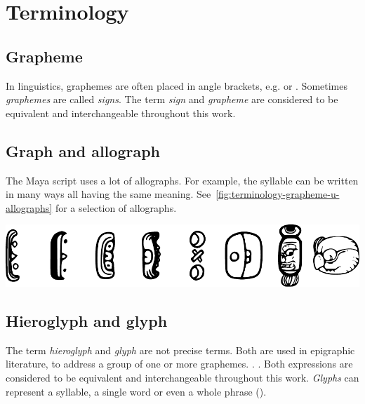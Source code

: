 \documentclass[../main.tex]{subfiles}
\begin{document}
\chapter{Terminology}

\section{Grapheme}
In linguistics, graphemes are often placed in angle brackets, e.g.  or .
Sometimes \emph{graphemes} are called \emph{signs}.
The term \emph{sign} and \emph{grapheme} are considered to be equivalent and 
interchangeable throughout this work.

\section{Graph and allograph}
The Maya script uses a lot of allographs.
For example, the syllable  can be written in many ways all having the same meaning.
See~\ref{fig:terminology-grapheme-u-allographs} for a selection of allographs.
\begin{center}
    \includegraphics[width=\textwidth,keepaspectratio]{img/grapheme-u-allographs}
    \label{fig:terminology-grapheme-u-allographs}
\end{center}

\section{Hieroglyph and glyph}
The term \emph{hieroglyph} and \emph{glyph} are not precise terms.
Both are used in epigraphic literature, to address a group of one or more graphemes.
.
. 
Both expressions are considered to be equivalent and interchangeable throughout this work.
\emph{Glyphs} can represent a syllable, a single word or even a whole phrase 
(\cite[23]{macrilooper2003}).
\end{document}
